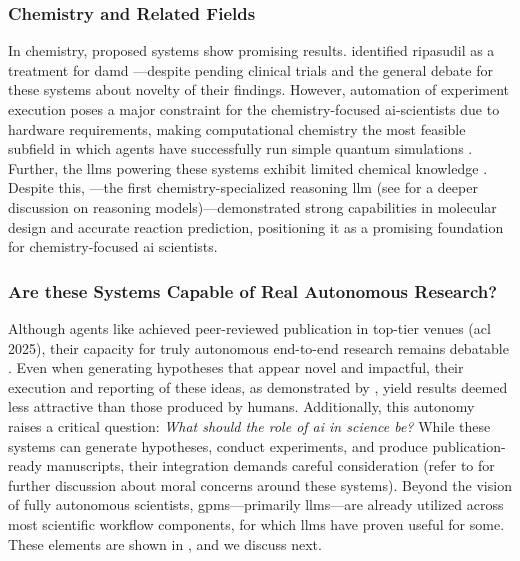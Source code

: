 \subsubsection{Chemistry and Related Fields}

In chemistry, proposed systems show promising results.  identified ripasudil as a treatment for \gls{damd} \autocite{ghareeb2025robin0}---despite pending clinical trials and the general debate for these systems about novelty of their findings\autocite{Listgarten2024perpetual}.
However, automation of experiment execution poses a major constraint for the chemistry-focused \gls{ai}-scientists due to hardware requirements, making computational chemistry the most feasible subfield in which agents have successfully run simple quantum simulations \autocite{Zou2025ElAgente}. 
Further, the \glspl{llm} powering these systems exhibit limited chemical knowledge \autocite{mirza2024large}. 
Despite this,  \autocite{narayanan2025training}---the first chemistry-specialized reasoning \gls{llm} (see  for a deeper discussion on reasoning models)---demonstrated strong capabilities in molecular design and accurate reaction prediction, positioning it as a promising foundation for chemistry-focused \gls{ai} scientists.

\subsubsection{Are these Systems Capable of Real Autonomous Research?}

Although agents like  \autocite{intologyai2025zochi} achieved peer-reviewed publication in top-tier venues (\gls{acl} 2025), their capacity for truly autonomous end-to-end research remains debatable \autocite{son2025ai}. 
Even when generating hypotheses that appear novel and impactful, their execution and reporting of these ideas, as demonstrated by \textcite{si2025ideation1execution}, yield results deemed less attractive than those produced by humans. Additionally, this autonomy raises a critical question: \textit{What should the role of \gls{ai} in science be?} 
While these systems can generate hypotheses, conduct experiments, and produce publication-ready manuscripts, their integration demands careful consideration (refer to  for further discussion about moral concerns around these systems). 
Beyond the vision of fully autonomous scientists, \glspl{gpm}---primarily \glspl{llm}---are already utilized across most scientific workflow components, for which \glspl{llm} have proven useful for some. 
These elements are shown in , and we discuss next.


